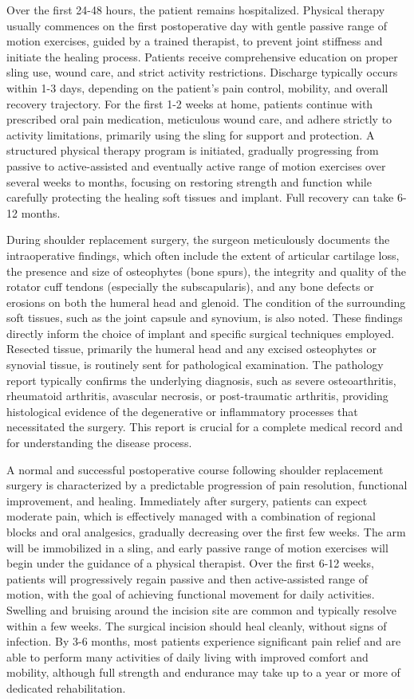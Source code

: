 Over the first 24-48 hours, the patient remains hospitalized. Physical therapy usually commences on the first postoperative day with gentle passive range of motion exercises, guided by a trained therapist, to prevent joint stiffness and initiate the healing process. Patients receive comprehensive education on proper sling use, wound care, and strict activity restrictions. Discharge typically occurs within 1-3 days, depending on the patient's pain control, mobility, and overall recovery trajectory. For the first 1-2 weeks at home, patients continue with prescribed oral pain medication, meticulous wound care, and adhere strictly to activity limitations, primarily using the sling for support and protection. A structured physical therapy program is initiated, gradually progressing from passive to active-assisted and eventually active range of motion exercises over several weeks to months, focusing on restoring strength and function while carefully protecting the healing soft tissues and implant. Full recovery can take 6-12 months.

During shoulder replacement surgery, the surgeon meticulously documents the intraoperative findings, which often include the extent of articular cartilage loss, the presence and size of osteophytes (bone spurs), the integrity and quality of the rotator cuff tendons (especially the subscapularis), and any bone defects or erosions on both the humeral head and glenoid. The condition of the surrounding soft tissues, such as the joint capsule and synovium, is also noted. These findings directly inform the choice of implant and specific surgical techniques employed. Resected tissue, primarily the humeral head and any excised osteophytes or synovial tissue, is routinely sent for pathological examination. The pathology report typically confirms the underlying diagnosis, such as severe osteoarthritis, rheumatoid arthritis, avascular necrosis, or post-traumatic arthritis, providing histological evidence of the degenerative or inflammatory processes that necessitated the surgery. This report is crucial for a complete medical record and for understanding the disease process.

A normal and successful postoperative course following shoulder replacement surgery is characterized by a predictable progression of pain resolution, functional improvement, and healing. Immediately after surgery, patients can expect moderate pain, which is effectively managed with a combination of regional blocks and oral analgesics, gradually decreasing over the first few weeks. The arm will be immobilized in a sling, and early passive range of motion exercises will begin under the guidance of a physical therapist. Over the first 6-12 weeks, patients will progressively regain passive and then active-assisted range of motion, with the goal of achieving functional movement for daily activities. Swelling and bruising around the incision site are common and typically resolve within a few weeks. The surgical incision should heal cleanly, without signs of infection. By 3-6 months, most patients experience significant pain relief and are able to perform many activities of daily living with improved comfort and mobility, although full strength and endurance may take up to a year or more of dedicated rehabilitation.

